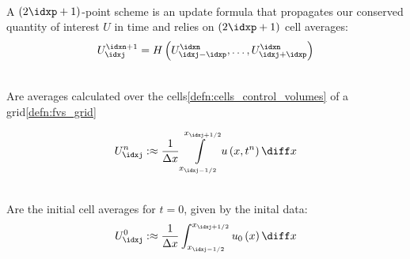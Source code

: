 \begin{defnbox}\nospacing
    \begin{defn}\label{defn:general_evolution_equation}\leavevmode\\
        A $(2\idxp+1)$-point scheme is an update formula that propagates our conserved quantity of interest $U$ in time
        and relies on $(2\idxp+1)$ cell averages:
        \begin{align}
          U_{\idxj}^{\idxn+1}=H \left(U_{\idxj-\idxp}^{\idxn},\ldots,U_{\idxj+\idxp}^{\idxn}\right)
        \end{align}
    \end{defn}
\end{defnbox}
\begin{defnbox}\nospacing
    \begin{defn}\label{defn:cell_averages}\leavevmode\\
      Are averages calculated over the cells\cref{defn:cells_control_volumes} of a grid\cref{defn:fvs_grid}
      \begin{minipage}{0.45\textwidth}
      \begin{align}
        U_{\idxj}^{n}:\approx\frac{1}{\Delta x}\int\limits_{x_{\idxj-1/2}}^{x_{\idxj+1/2}}u\left(x,t^{n}\right)\diff x
      \end{align}
      \end{minipage}\hfill
      \begin{minipage}[c]{0.45\textwidth}
          \begin{figure}[H]
              \centering{
                \def\svgwidth{100pt}
                \resizebox{\linewidth}{!}{}
              }
          \end{figure}
      \end{minipage}
    \end{defn}
\end{defnbox}
\begin{corbox}\nospacing
    \begin{cor}\label{cor:initial_cell_averages}\leavevmode\\
      Are the initial cell averages for $t=0$, given by the inital data:
      \begin{align}
        U_{\idxj}^{0}:\approx\frac{1}{\Delta x}\int_{x_{\idxj-1/2}}^{x_{\idxj+1/2}}u_{0}\left(x\right)\diff x
      \end{align}
    \end{cor}
\end{corbox}
